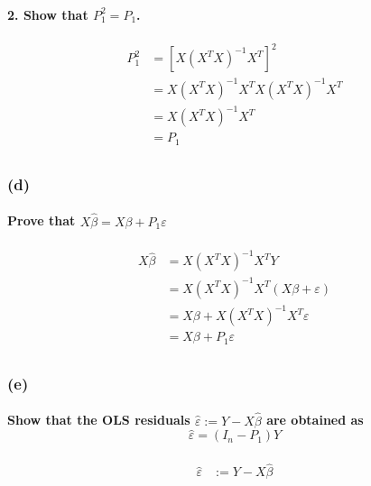 \documentclass{article}
\begin{document}
\paragraph{2. Show that $P_{1}^{2}=P_{1}$.}
\begin{align*}
    P_1^2
     & = \left[ X\left(X^{T} X\right)^{-1} X^{T} \right]^2                  \\
     & =  X\left(X^{T} X\right)^{-1} X^{T} X\left(X^{T} X\right)^{-1} X^{T} \\
     & =  X\left(X^{T} X\right)^{-1} X^{T}                                  \\
     & =  P_1                                                               \\
\end{align*}

\subsubsection{(d)}
\paragraph{Prove that $X \hat{\beta}=X \beta+P_{1} \varepsilon$}

\begin{align*}
    X \hat \beta
     & = X \left(X^T X \right)^{-1} X^T Y                                    \\
     & = X \left(X^T X \right)^{-1} X^T \left( X \beta + \varepsilon \right) \\
     & = X \beta + X \left(X^T X \right)^{-1} X^T \varepsilon                \\
     & = X \beta + P_1 \varepsilon                                           \\
\end{align*}


\subsubsection{(e)}
\paragraph{Show that the OLS residuals $\hat{\varepsilon}:=Y-X \hat{\beta}$ are obtained as
    $$
        \hat{\varepsilon}=\left(I_{n}-P_{1}\right) Y
    $$}

\begin{align*}
    \hat{\varepsilon}
     & := Y-X \hat{\beta} \\
\end{align*}
\end{document}
